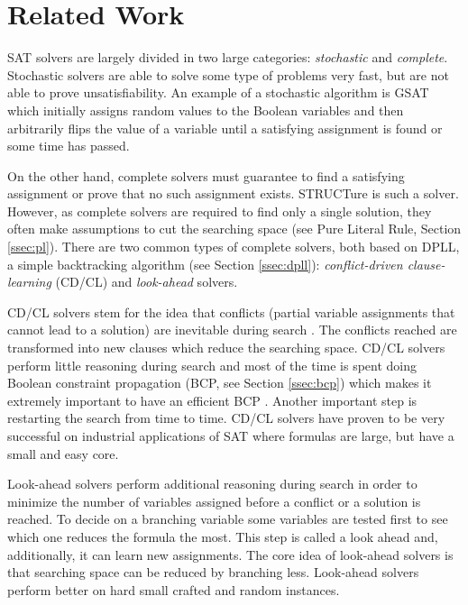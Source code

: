 \chapter{Related Work}
\label{chap:related}

SAT solvers are largely divided in two large categories:
\emph{stochastic} and \emph{complete}.  Stochastic solvers are
able to solve some type of problems very fast, but are not able
to prove unsatisfiability. An example of a stochastic algorithm
is GSAT \cite{Selman95localsearch} which initially assigns random
values to the Boolean variables and then arbitrarily flips the value
of a variable until a satisfying assignment is found or some time
has passed.

On the other hand, complete solvers must guarantee to find a
satisfying assignment or prove that no such assignment exists.
STRUCTure is such a solver. However, as complete solvers are
required to find only a single solution, they often make
assumptions to cut the searching space (see Pure Literal Rule,
Section \ref{ssec:pl}).  There are two common types of complete
solvers, both based on DPLL, a simple backtracking algorithm (see
Section \ref{ssec:dpll}): \emph{conflict-driven clause-learning}
(CD/CL) and \emph{look-ahead} solvers.

CD/CL solvers stem for the idea that conflicts (partial variable
assignments that cannot lead to a solution) are inevitable during
search \cite{Marques-silva99grasp:a}. The conflicts reached are
transformed into new clauses which reduce the searching space.
CD/CL solvers perform little reasoning during search and most
of the time is spent doing Boolean constraint propagation (BCP,
see Section \ref{ssec:bcp}) which makes it extremely important to
have an efficient BCP \cite{Moskewicz:2001:CEE:378239.379017}. Another
important step is restarting the search from time to time. CD/CL
solvers have proven to be very successful on industrial applications
of SAT where formulas are large, but have a small and easy core.

Look-ahead solvers perform additional reasoning during search in
order to minimize the number of variables assigned before a conflict
or a solution is reached. To decide on a branching variable
some variables are tested first to see which one reduces the formula
the most. This step is called a look ahead and, additionally,
it can learn new assignments. The core idea of look-ahead solvers is
that searching space can be reduced by branching less. Look-ahead
solvers perform better on hard small crafted and random instances.

